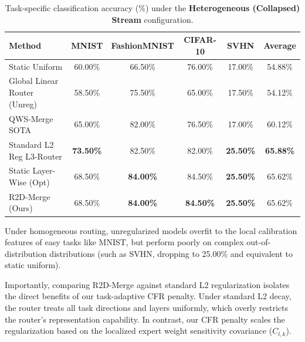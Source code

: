\begin{table}[t]
\caption{Task-specific classification accuracy (\%) under the \textbf{Heterogeneous (Collapsed) Stream} configuration.}
\label{tab:collapsed_breakdown}
\vskip 0.15in
\begin{center}
\begin{small}
\begin{sc}
\begin{tabular}{lccccc}
\toprule
Method & MNIST & FashionMNIST & CIFAR-10 & SVHN & Average \\
\midrule
Static Uniform & 60.00\% & 66.50\% & 76.00\% & 17.00\% & 54.88\% \\
Global Linear Router (Unreg) & 58.50\% & 75.50\% & 65.00\% & 17.50\% & 54.12\% \\
QWS-Merge SOTA & 65.00\% & 82.00\% & 76.50\% & 17.00\% & 60.12\% \\
Standard L2 Reg L3-Router & \textbf{73.50\%} & 82.50\% & 82.00\% & \textbf{25.50\%} & \textbf{65.88\%} \\
Static Layer-Wise (Opt) & 68.50\% & \textbf{84.00\%} & 84.50\% & \textbf{25.50\%} & 65.62\% \\
R2D-Merge (Ours) & 68.50\% & \textbf{84.00\%} & \textbf{84.50\%} & \textbf{25.50\%} & 65.62\% \\
\bottomrule
\end{tabular}
\end{sc}
\end{small}
\end{center}
\vskip -0.1in
\end{table}

Under homogeneous routing, unregularized models overfit to the local calibration features of easy tasks like MNIST, but perform poorly on complex out-of-distribution distributions (such as SVHN, dropping to 25.00\% and equivalent to static uniform). 

Importantly, comparing R2D-Merge against standard L2 regularization isolates the direct benefits of our task-adaptive CFR penalty. Under standard L2 decay, the router treats all task directions and layers uniformly, which overly restricts the router's representation capability. In contrast, our CFR penalty scales the regularization based on the localized expert weight sensitivity covariance ($C_{l, k}$). 

